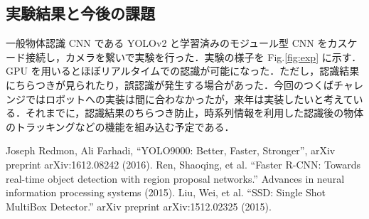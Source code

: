 \documentclass[twocolumn,10pt]{jarticle}
\begin{document}
\subsection{実験結果と今後の課題}
一般物体認識 CNN である YOLOv2 と学習済みのモジュール型 CNN をカスケード接続し，カメラを繋いで実験を行った．実験の様子を Fig.\ref{fig:exp} に示す．GPU を用いるとほぼリアルタイムでの認識が可能になった．ただし，認識結果にちらつきが見られたり，誤認識が発生する場合があった．今回のつくばチャレンジではロボットへの実装は間に合わなかったが，来年は実装したいと考えている．それまでに，認識結果のちらつき防止，時系列情報を利用した認識後の物体のトラッキングなどの機能を組み込む予定である．
\begin{thebibliography}{9}
  Joseph Redmon, Ali Farhadi, ``YOLO9000: Better, Faster, Stronger'', arXiv preprint arXiv:1612.08242 (2016).
 Ren, Shaoqing, et al. ``Faster R-CNN: Towards real-time object detection with region proposal networks.'' Advances in neural information processing systems (2015).
 Liu, Wei, et al. ``SSD: Single Shot MultiBox Detector.'' arXiv preprint arXiv:1512.02325 (2015).
\end{thebibliography}
\end{document}
